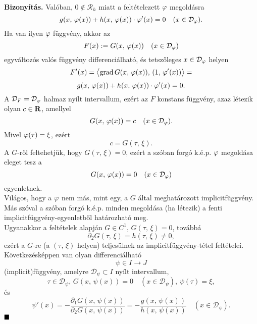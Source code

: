 \textbf{Bizonyítás.} Valóban, $0 \not \in \mathcal{R}_h$ miatt a feltételezett $\varphi$ megoldásra
\[
	g(x, \, \varphi(x)) + h(x, \, \varphi(x)) \cdot \varphi'(x) = 0 \quad (x \in \mathcal{D}_\varphi).
\]
Ha van ilyen $\varphi$ függvény, akkor az
\[
	F(x) := G(x, \, \varphi(x)) \quad (x \in \mathcal{D}_\varphi)
\]
egyváltozós valós függvény differenciálható, és tetszőleges $x \in \mathcal{D}_\varphi$ helyen
\[
	F'(x) = \big\langle \text{grad} \, G(x, \, \varphi(x)), \, (1, \, \varphi'(x)) \big\rangle =
\]
\[
	g(x, \, \varphi(x)) + h(x, \, \varphi(x)) \cdot \varphi'(x) = 0.
\]
A $\mathcal{D}_F = \mathcal{D}_\varphi$ halmaz nyílt intervallum, ezért az $F$ konstans függvény, azaz létezik olyan $c \in \mathbf{R}$, amellyel
\[
	G(x, \, \varphi(x)) = c \quad (x \in \mathcal{D}_\varphi).
\]
Mivel $\varphi(\tau) = \xi$, ezért
\[
	c = G(\tau, \, \xi).
\]
A $G$-ről feltehetjük, hogy $G(\tau, \, \xi) = 0$, ezért a szóban forgó k.é.p. $\varphi$ megoldása eleget tesz a 
\[
	G(x, \, \varphi(x)) = 0 \quad (x \in \mathcal{D}_\varphi)
\]
egyenletnek.\\

Világos, hogy a $\varphi$ nem más, mint egy, a $G$ által meghatározott implicitfüggvény. Más szóval a szóban forgó k.é.p. minden megoldása (ha létezik) a fenti implicitfüggvény-egyenletből határozható meg.\\

Ugyanakkor a feltételek alapján $G \in C^1, \, G(\tau, \, \xi) = 0$, továbbá
\[
	\partial_2G(\tau, \, \xi) = h(\tau, \, \xi) \neq 0,
\]
ezért a $G$-re (a $(\tau, \, \xi)$ helyen) teljesülnek az implicitfüggvény-tétel feltételei. Következésképpen van olyan differenciálható
\[
	\psi \in I \to J
\]
(implicit)függvény, amelyre $\mathcal{D}_\psi \subset I$ nyílt intervallum,
\[
	\tau \in \mathcal{D}_\psi, \, G(x, \, \psi(x)) = 0 \quad (x \in \mathcal{D}_\psi), \, \psi(\tau) = \xi,
\]
és
\[
	\psi'(x) = - \frac{\partial_1G(x, \, \psi(x))}{\partial_2G(x, \, \psi(x))} = - \frac{g(x, \, \psi(x))}{h(x, \, \psi(x))} \quad (x \in \mathcal{D}_\psi).
\]
$\hfill \blacksquare$